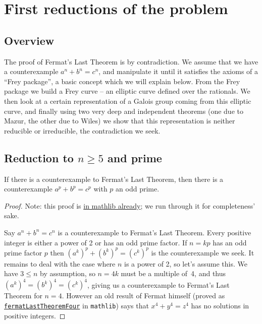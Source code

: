 \chapter{First reductions of the problem}\label{ch_reductions}

\section{Overview}
The proof of Fermat's Last Theorem is by contradiction. We assume that we have a counterexample
$a^n+b^n=c^n$, and manipulate it until it satisfies the axioms of a ``Frey package'', a basic
concept which we will explain below. From the
Frey package we build a Frey curve -- an elliptic curve defined over the rationals. We then look at
a certain representation of a Galois group coming from this elliptic curve, and finally using two
very deep and independent theorems (one due to Mazur, the other due to Wiles) we show that this
representation is neither reducible or irreducible, the contradiction we seek.

\section{Reduction to \texorpdfstring{$n\geq5$}{ngeq5} and prime}

\begin{lemma}\label{FermatLastTheorem.of_odd_primes}\leanok
  If there is a counterexample to Fermat's Last Theorem, then there is a counterexample $a^p+b^p=c^p$
  with $p$ an odd prime.
\end{lemma}
\begin{proof}\leanok
  Note: this proof is \href{https://leanprover-community.github.io/mathlib4_docs/Mathlib/NumberTheory/FLT/Four.html#FermatLastTheorem.of_odd_primes}{in mathlib already};
  we run through it for completeness' sake.

  Say $a^n + b^n = c^n$ is a counterexample to Fermat's Last Theorem. Every positive integer is either
  a power of 2 or has an odd prime factor. If $n=kp$ has an odd prime factor $p$ then
  $(a^k)^p+(b^k)^p=(c^k)^p$ is the counterexample we seek. It remains to deal with the case where
  $n$ is a power of 2, so let's assume this. We have $3\leq n$ by assumption, so
  $n=4k$ must be a multiple of~4, and thus $(a^k)^4=(b^k)^4=(c^k)^4$, giving us a counterexample
  to Fermat's Last Theorem for $n=4$. However an old result of Fermat himself (proved as
  \href{https://leanprover-community.github.io/mathlib4_docs/Mathlib/NumberTheory/FLT/Four.html#fermatLastTheoremFour}{\tt fermatLastTheoremFour}
  in {\tt mathlib}) says that $x^4+y^4=z^4$ has no solutions in positive integers.
\end{proof}

